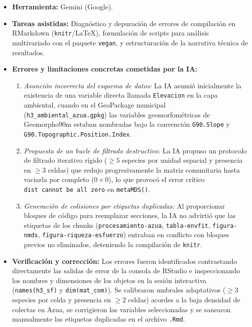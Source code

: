 \documentclass[
  12pt,
  man,
  floatsintext]{apa7}
\providecommand{\tightlist}{%
  \setlength{\itemsep}{0pt}\setlength{\parskip}{0pt}}
\begin{document}
\begin{itemize}
\tightlist
\item
  \textbf{Herramienta:} Gemini (Google).
\item
  \textbf{Tareas asistidas:} Diagnóstico y depuración de errores de compilación en RMarkdown (\texttt{knitr}/LaTeX), formulación de scripts para análisis multivariado con el paquete \texttt{vegan}, y estructuración de la narrativa técnica de resultados.
\item
  \textbf{Errores y limitaciones concretas cometidas por la IA:}

  \begin{enumerate}
  \def\labelenumi{\arabic{enumi}.}
  \tightlist
  \item
    \emph{Asunción incorrecta del esquema de datos:} La IA asumió inicialmente la existencia de una variable directa llamada \texttt{Elevacion} en la capa ambiental, cuando en el GeoPackage municipal (\texttt{h3\_ambiental\_azua.gpkg}) las variables geomorfométricas de Geomorpho90m estaban nombradas bajo la convención \texttt{G90.Slope} y \texttt{G90.Topographic.Position.Index}.
  \item
    \emph{Propuesta de un bucle de filtrado destructivo:} La IA propuso un protocolo de filtrado iterativo rígido (\(\ge 5\) especies por unidad espacial y presencia en \(\ge 3\) celdas) que redujo progresivamente la matriz comunitaria hasta vaciarla por completo (\(0 \times 0\)), lo que provocó el error crítico \texttt{\textquotesingle{}dist\textquotesingle{}\ cannot\ be\ all\ zero} en \texttt{metaMDS()}.
  \item
    \emph{Generación de colisiones por etiquetas duplicadas:} Al proporcionar bloques de código para reemplazar secciones, la IA no advirtió que las etiquetas de los chunks (\texttt{procesamiento-azua}, \texttt{tabla-envfit}, \texttt{figura-nmds}, \texttt{figura-riqueza-esfuerzo}) entraban en conflicto con bloques previos no eliminados, deteniendo la compilación de \texttt{knitr}.
  \end{enumerate}
\item
  \textbf{Verificación y corrección:} Los errores fueron identificados contrastando directamente las salidas de error de la consola de RStudio e inspeccionando los nombres y dimensiones de los objetos en la sesión interactiva (\texttt{names(h3\_sf)} y \texttt{dim(mat\_com)}). Se calibraron umbrales adaptativos (\(\ge 3\) especies por celda y presencia en \(\ge 2\) celdas) acordes a la baja densidad de colectas en Azua, se corrigieron las variables seleccionadas y se sanearon manualmente las etiquetas duplicadas en el archivo \texttt{.Rmd}.
\end{itemize}
\end{document}
